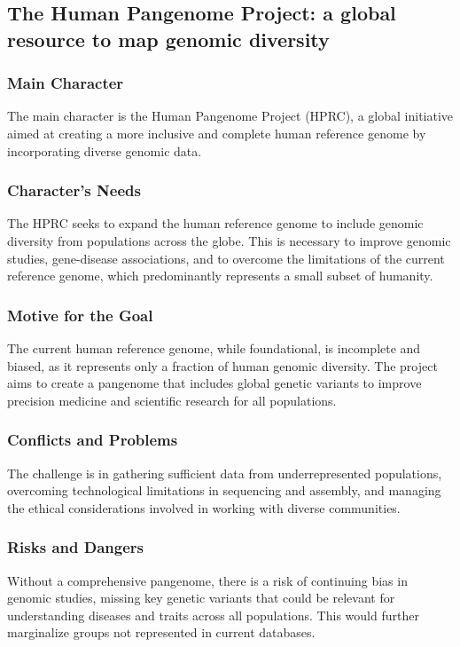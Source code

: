 \subsection{The Human Pangenome Project: a global resource to map genomic diversity}
\subsubsection{Main Character}
The main character is the Human Pangenome Project (HPRC), a global initiative aimed at creating a more inclusive and complete human reference genome by incorporating diverse genomic data.

\subsubsection{Character's Needs}
The HPRC seeks to expand the human reference genome to include genomic diversity from populations across the globe. This is necessary to improve genomic studies, gene-disease associations, and to overcome the limitations of the current reference genome, which predominantly represents a small subset of humanity.

\subsubsection{Motive for the Goal}
The current human reference genome, while foundational, is incomplete and biased, as it represents only a fraction of human genomic diversity. The project aims to create a pangenome that includes global genetic variants to improve precision medicine and scientific research for all populations.

\subsubsection{Conflicts and Problems}
The challenge is in gathering sufficient data from underrepresented populations, overcoming technological limitations in sequencing and assembly, and managing the ethical considerations involved in working with diverse communities.

\subsubsection{Risks and Dangers}
Without a comprehensive pangenome, there is a risk of continuing bias in genomic studies, missing key genetic variants that could be relevant for understanding diseases and traits across all populations. This would further marginalize groups not represented in current databases.

